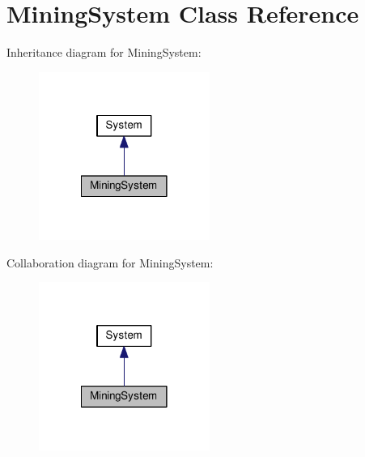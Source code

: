 \hypertarget{classMiningSystem}{\section{Mining\-System Class Reference}
\label{classMiningSystem}
}


Inheritance diagram for Mining\-System\-:
\nopagebreak
\begin{figure}[H]
\begin{center}
\leavevmode
\includegraphics[width=158pt]{classMiningSystem__inherit__graph}
\end{center}
\end{figure}


Collaboration diagram for Mining\-System\-:
\nopagebreak
\begin{figure}[H]
\begin{center}
\leavevmode
\includegraphics[width=158pt]{classMiningSystem__coll__graph}
\end{center}
\end{figure}
